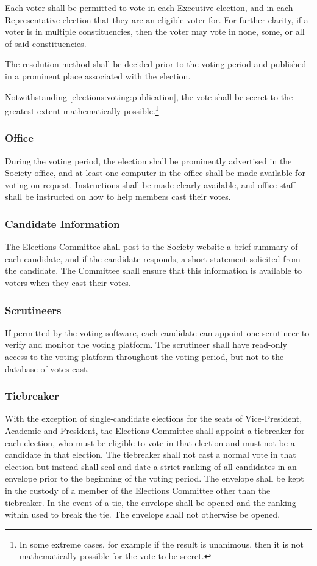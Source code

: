 Each voter shall be permitted to vote in each Executive election, and in each Representative election that they are an eligible voter for.
For further clarity, if a voter is in multiple constituencies, then the voter may vote in none, some, or all of said constituencies.

The resolution method shall be decided prior to the voting period and published in a prominent place associated with the election.

Notwithstanding \cref{elections:voting:publication}, the vote shall be secret to the greatest extent mathematically possible.\footnote{In some extreme cases, for example if the result is unanimous, then it is not mathematically possible for the vote to be secret.}

\subsubsection{Office}
During the voting period, the election shall be prominently advertised in the Society office, and at least one computer in the office shall be made available for voting on request.
Instructions shall be made clearly available, and office staff shall be instructed on how to help members cast their votes.

\subsubsection{Candidate Information}
The Elections Committee shall post to the Society website a brief summary of each candidate, and if the candidate responds, a short statement solicited from the candidate.
The Committee shall ensure that this information is available to voters when they cast their votes.

\subsubsection{Scrutineers}
If permitted by the voting software, each candidate can appoint one scrutineer to verify and monitor the voting platform.
The scrutineer shall have read-only access to the voting platform throughout the voting period, but not to the database of votes cast.

\subsubsection{Tiebreaker}
With the exception of single-candidate elections for the seats of Vice-President, Academic and President, the Elections Committee shall appoint a tiebreaker for each election, who must be eligible to vote in that election and must not be a candidate in that election.
The tiebreaker shall not cast a normal vote in that election but instead shall seal and date a strict ranking of all candidates in an envelope prior to the beginning of the voting period.
The envelope shall be kept in the custody of a member of the Elections Committee other than the tiebreaker.
In the event of a tie, the envelope shall be opened and the ranking within used to break the tie.
The envelope shall not otherwise be opened.

